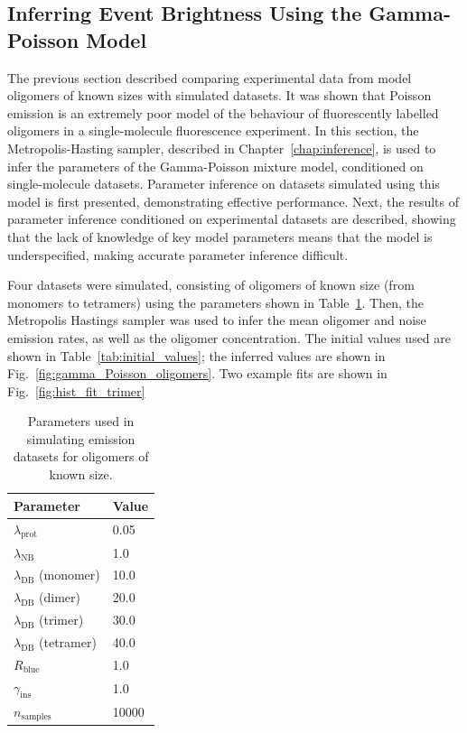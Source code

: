\clearpage

\subsection{Inferring Event Brightness Using the Gamma-Poisson Model}
The previous section described comparing experimental data from model oligomers of known sizes with simulated datasets. It was shown that Poisson emission is an extremely poor model of the behaviour of fluorescently labelled oligomers in a single-molecule fluorescence experiment. In this section, the Metropolis-Hasting sampler, described in Chapter~\autoref{chap:inference}, is used to infer the parameters of the Gamma-Poisson mixture model, conditioned on single-molecule datasets. Parameter inference on datasets simulated using this model is first presented, demonstrating effective performance. Next, the results of parameter inference conditioned on experimental datasets are described, showing that the lack of knowledge of key model parameters means that the model is underspecified, making accurate parameter inference difficult.

Four datasets were simulated, consisting of oligomers of known size (from monomers to tetramers) using the parameters shown in Table~\ref{tab:oligomer_params}. Then, the Metropolis Hastings sampler was used to infer the mean oligomer and noise emission rates, as well as the oligomer concentration. The initial values used are shown in Table~\ref{tab:initial_values}; the inferred values are shown in Fig.~\ref{fig:gamma_Poisson_oligomers}. Two example fits are shown in Fig.~\ref{fig:hist_fit_trimer}

\begin{center}
\begin{table}[!ht]
\caption{Parameters used in simulating emission datasets for oligomers of known size.}
\begin{tabular}{|l|l|}
\hline
{\bf Parameter} & {\bf Value}\\ \hline
$\lambda_{\text{prot}}$ & 0.05\\
$\lambda_{\text{NB}}$ & 1.0\\
$\lambda_{\text{DB}}$ (monomer) & 10.0\\
$\lambda_{\text{DB}}$ (dimer) & 20.0\\
$\lambda_{\text{DB}}$ (trimer) & 30.0\\
$\lambda_{\text{DB}}$ (tetramer) & 40.0\\
$R_{\text{blue}}$ & 1.0\\
$\gamma_{\text{ins}}$ & 1.0\\
$n_{\text{samples}}$ & 10000\\ \hline
\end{tabular}
\label{tab:oligomer_params}
\end{table}
\end{center}

